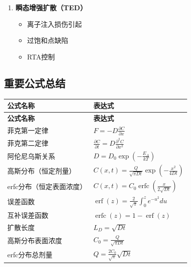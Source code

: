 \documentclass[UTF8,12pt,a4paper]{ctexart}
\begin{document}
\begin{enumerate}
    \item \textbf{瞬态增强扩散（TED）}
    \begin{itemize}
        \item 离子注入损伤引起
        \item 过饱和点缺陷
        \item RTA控制
    \end{itemize}
\end{enumerate}

\subsection{重要公式总结}

\begin{longtable}{|L{6cm}|L{9cm}|}
\hline
\textbf{公式名称} & \textbf{表达式} \\
\hline
\endfirsthead
\hline
\textbf{公式名称} & \textbf{表达式} \\
\hline
\endhead
\hline
\endfoot

菲克第一定律 & $F = -D\frac{\partial C}{\partial x}$ \\
\hline

菲克第二定律 & $\frac{\partial C}{\partial t} = D\frac{\partial^2 C}{\partial x^2}$ \\
\hline

阿伦尼乌斯关系 & $D = D_0\exp\left(-\frac{E_A}{kT}\right)$ \\
\hline

高斯分布（恒定剂量） & $C(x,t) = \frac{Q}{\sqrt{\pi Dt}}\exp\left(-\frac{x^2}{4Dt}\right)$ \\
\hline

erfc分布（恒定表面浓度） & $C(x,t) = C_0\operatorname{erfc}\left(\frac{x}{2\sqrt{Dt}}\right)$ \\
\hline

误差函数 & $\operatorname{erf}(z) = \frac{2}{\sqrt{\pi}}\int_0^z e^{-u^2}du$ \\
\hline

互补误差函数 & $\operatorname{erfc}(z) = 1 - \operatorname{erf}(z)$ \\
\hline

扩散长度 & $L_D = \sqrt{Dt}$ \\
\hline

高斯分布表面浓度 & $C_0 = \frac{Q}{\sqrt{\pi Dt}}$ \\
\hline

erfc分布总剂量 & $Q = \frac{2C_0}{\sqrt{\pi}}\sqrt{Dt}$ \\
\hline


\end{longtable}
\end{document}

